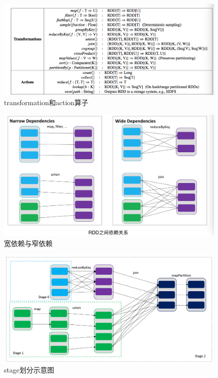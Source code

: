 \begin{figure}
    \centering
    \includegraphics[width=1\textwidth]{Img/rdd-transformations-actions.png}
    \caption{transformation和action算子}
    \label{fig:rdd-transformation-action}
\end{figure}

\begin{figure}
    \centering
    \includegraphics[width=1\textwidth]{Img/rdd-dependency.png}
    \caption{宽依赖与窄依赖}
    \label{fig:rdd-dependency}
\end{figure}


\begin{figure}
    \centering
    \includegraphics[width=1\textwidth]{Img/rdd-dag.png}
    \caption{stage划分示意图}
    \label{fig:rdd-dag-stage}
\end{figure}


